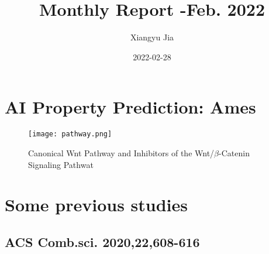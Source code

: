 \documentclass{article}
\title{Monthly Report -Feb. 2022}
\date{2022-02-28}
\author{Xiangyu Jia}
\begin{document}
\maketitle
\newpage
{}

\section{AI Property Prediction: Ames}


\begin{figure}[h]
  \texttt{[image: pathway.png]}
  \caption{Canonical Wnt Pathway and Inhibitors of the Wnt/$\beta$-Catenin Signaling Pathwat}
  \label{pathway}
\end{figure}


\section{Some previous studies}
\subsection{ACS Comb.sci. 2020,22,608-616}
\end{document}
